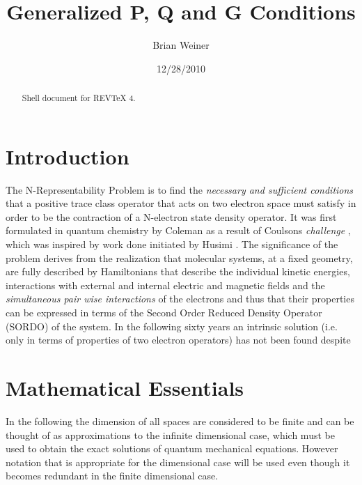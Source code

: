 \documentclass[aps,preprint]{revtex4}%
\begin{document}
\title[P,Q, and G Conditions]{Generalized P, Q and G Conditions}
\author{Brian Weiner}

\begin{abstract}
Shell document for REV\TeX{} 4.

\end{abstract}
\date{12/28/2010}
\maketitle
\tableofcontents


\section{Introduction \label{Intro}}

The N-Representability Problem is to find the \emph{necessary and sufficient
conditions} that a positive trace class operator that acts on two electron
space must satisfy in order to be the contraction of a N-electron state
density operator. It was first formulated in quantum chemistry \cite{Coleman1}
by Coleman as a result of Coulsons \emph{challenge }\cite{Coulson}, which was
inspired by work done initiated by Husimi \cite{Husimi}. The significance of
the problem derives from the realization that molecular systems, at a fixed
geometry, are fully described by Hamiltonians that describe the individual
kinetic energies, interactions with external and internal electric and
magnetic fields and the \emph{simultaneous pair wise interactions} of the
electrons and thus that their properties can be expressed in terms of the
Second Order Reduced Density Operator (SORDO) of the system. In the following
sixty years an intrinsic solution (i.e. only in terms of properties of two
electron operators) has not been found despite

\section{Mathematical Essentials \label{Math}}

In the following the dimension of all spaces are considered to be finite and
can be thought of as approximations to the infinite dimensional case, which
must be used to obtain the exact solutions of quantum mechanical equations.
However notation that is appropriate for the dimensional case will be used
even though it becomes redundant in the finite dimensional case.
\end{document}
